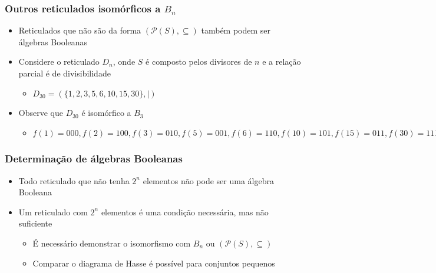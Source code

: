\documentclass[12pt]{beamer}
\begin{document}
\begin{frame}
  \frametitle{Outros reticulados isomórficos a $B_{n}$}
  \begin{itemize}
    \item<1-> Reticulados que não são da forma $(\mathcal{P}(S), \subseteq)$
        também podem ser álgebras Booleanas
    \item<2-> Considere o reticulado $D_{n}$, onde $S$ é composto pelos
        divisores de $n$ e a relação parcial é de divisibilidade
    \begin{itemize}
      \item $D_{30} = (\{1, 2, 3, 5, 6, 10, 15, 30\}, \mid)$
    \end{itemize}
    \item<3-> Observe que $D_{30}$ é isomórfico a $B_{3}$
    \begin{itemize}
      \item<4-> {\small $f(1) = 000, f(2) = 100, f(3) = 010, f(5) = 001, f(6) =
          110, f(10) = 101, f(15) = 011, f(30) = 111$}
    \end{itemize}
  \end{itemize}
\end{frame}

\begin{frame}
  \frametitle{Determinação de álgebras Booleanas}
  \begin{itemize}
    \item<1-> Todo reticulado que não tenha $2^{n}$ elementos não pode ser uma
        álgebra Booleana
    \item<2-> Um reticulado com $2^{n}$ elementos é uma condição necessária, mas
        não suficiente
    \begin{itemize}[itemsep=0pt]
      \item<3-> É necessário demonstrar o isomorfismo com $B_{n}$ ou
          $(\mathcal{P}(S), \subseteq)$
      \item<3-> Comparar o diagrama de Hasse é possível para conjuntos pequenos
    \end{itemize}
  \end{itemize}
\end{frame}
\end{document}
